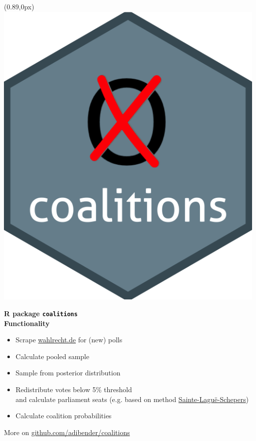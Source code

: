 \documentclass[10pt,xcolor=dvipsnames,t,headinclude,headsepline=1.5cm,usepdftitle=false]{beamer}
\begin{document}
\begin{frame}[fragile]
\begin{textblock*}{1.25cm}(0.89\textwidth,0px)
\includegraphics[width=1\textwidth]{figures/coalitions_hex}
\end{textblock*}
\vspace{10px}
\textbf{R package \texttt{coalitions}}
\\[1cm]
\textbf{Functionality}
\begin{itemize}
  \item Scrape \href{https://www.wahlrecht.de/}{wahlrecht.de} for (new) polls
  \item Calculate pooled sample
  \item Sample from posterior distribution
  \item Redistribute votes below 5\% threshold \\[0.1cm]
and calculate parliament seats 
{\footnotesize (e.g. based on method \href{http://www.wahlrecht.de/verfahren/rangmasszahlen.html}{Sainte-Lagu\"e-Schepers})}
  \item Calculate coalition probabilities
\end{itemize}
\bigskip
More on \href{https://github.com/adibender/coalitions/}{github.com/adibender/coalitions}
\end{frame}
\end{document}
